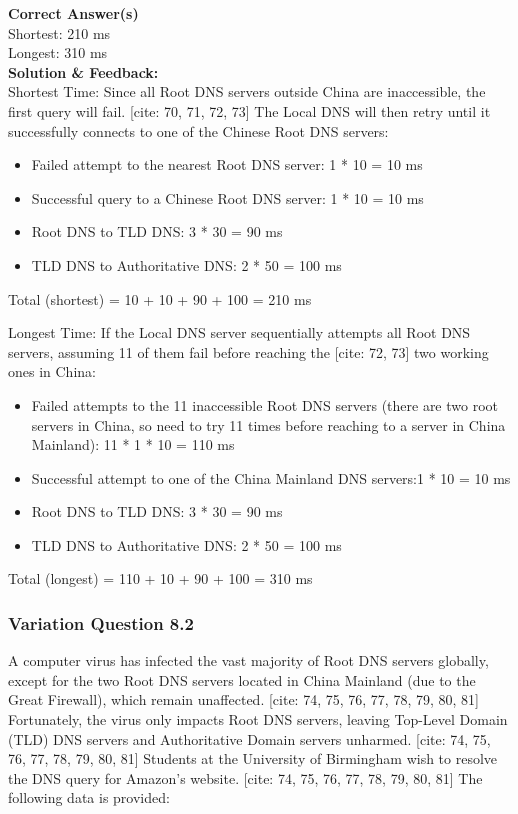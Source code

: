 \textbf{Correct Answer(s)}\\
Shortest: 210 ms\\
Longest: 310 ms\\
\textbf{Solution \& Feedback:}\\

Shortest Time: Since all Root DNS servers outside China are inaccessible, the first 
query will fail. [cite: 70, 71, 72, 73] The Local DNS will then retry until it successfully connects to one of the 
Chinese Root DNS servers:\\

\begin{itemize}
    \item Failed attempt to the nearest Root DNS server: 1 * 10 = 10 ms
    \item Successful query to a Chinese Root DNS server: 1 * 10 = 10 ms
    \item Root DNS to TLD DNS: 3 * 30 = 90 ms
    \item TLD DNS to Authoritative DNS: 2 * 50 = 100 ms
\end{itemize}

Total (shortest) = 10 + 10 + 90 + 100 = 210 ms

Longest Time: If the Local DNS server sequentially attempts all Root DNS servers, 
assuming 11 of them fail before reaching the
[cite: 72, 73] two working ones in China:

\begin{itemize}
    \item Failed attempts to the 11 inaccessible Root DNS servers (there are two root 
servers in China, so need to try 11 times before reaching to a server in China 
Mainland): 11 * 1 * 10 = 110 ms
    \item Successful attempt to one of the China Mainland DNS servers:1 * 10 = 10 ms
    \item Root DNS to TLD DNS: 3 * 30 = 90 ms
    \item TLD DNS to Authoritative DNS: 2 * 50 = 100 ms
\end{itemize}

Total (longest) = 110 + 10 + 90 + 100 = 310 ms

\subsubsection{Variation Question 8.2}

A computer virus has infected the vast majority of Root DNS servers 
globally, except for the two Root DNS servers located in China Mainland 
(due to the Great Firewall), which remain unaffected. [cite: 74, 75, 76, 77, 78, 79, 80, 81] Fortunately, the 
virus only impacts Root DNS servers, leaving Top-Level Domain (TLD) 
DNS servers and Authoritative Domain servers unharmed. [cite: 74, 75, 76, 77, 78, 79, 80, 81] Students at the 
University of Birmingham wish to resolve the DNS query for Amazon's 
website. [cite: 74, 75, 76, 77, 78, 79, 80, 81] The following data is provided:

